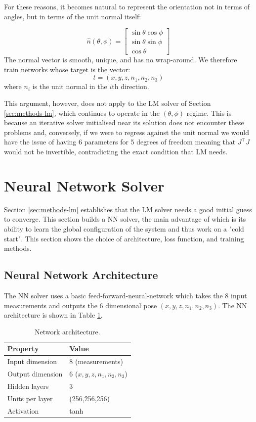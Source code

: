 For these reasons, it becomes natural to represent the orientation not in terms of angles, but in terms of the unit normal itself:

\begin{equation}
  \hat{n}(\theta,\phi) = \begin{bmatrix} \sin\theta\cos\phi \\ \sin\theta\sin\phi \\ \cos\theta \end{bmatrix}
\end{equation}
The normal vector is smooth, unique, and has no wrap-around. We therefore train networks whose target is the vector:
\begin{equation}
  t = (x,y,z,n_1,n_2,n_3)
\end{equation}
where $n_i$ is the unit normal in the $i$th direction.

This argument, however, does not apply to the LM solver of Section \ref{sec:methods-lm}, which continues to operate in the $(\theta,\phi)$ regime. This is because an iterative solver initialised near its solution does not encounter these problems and, conversely, if we were to regress against the unit normal we would have the issue of having 6 parameters for 5 degrees of freedom meaning that $J^{\top} J$ would not be invertible, contradicting the exact condition that LM needs.  


\section{Neural Network Solver}\label{sec:network}
Section \ref{sec:methods-lm} establishes that the LM solver needs a good initial guess to converge. This section builds a NN solver, the main advantage of which is its ability to learn the global configuration of the system and thus work on a "cold start". This section shows the choice of architecture, loss function, and training methods.
\subsection{Neural Network Architecture}
The NN solver uses a basic feed-forward-neural-network which takes the 8 input measurements and outputs the 6 dimensional pose $(x,y,z,n_1,n_2,n_3)$. The NN architecture is shown in Table \ref{tab:architecture}. 

\begin{table}
  \centering
  \begin{tabular}{ll}
    \toprule
    Property & Value \\
    \midrule
    Input dimension       & 8 (measurements) \\
    Output dimension      & 6 ($x, y, z, n_1, n_2, n_3$) \\
    Hidden layers         & 3 \\
    Units per layer       & (256,256,256) \\
    Activation            & tanh \\
    \bottomrule
  \end{tabular}
  \caption{Network architecture.}
  \label{tab:architecture}
\end{table}
